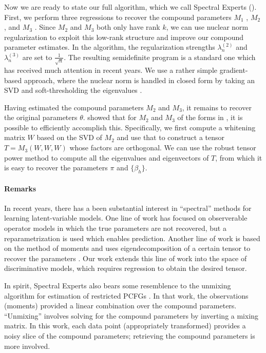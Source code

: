Now we are ready to state our full algorithm, which we call Spectral Experts
().
First, we perform three regressions to recover the compound parameters
$M_1$ ,
$M_2$ , and
$M_3$ .
Since $M_2$ and $M_3$ both only have rank $k$,
we can use nuclear norm regularization
\cite{Tomioka2011,NegahbanWainwright2009}
to exploit this low-rank structure and improve our compound parameter estimates.
In the algorithm, the regularization strengths $\lambda_n^{(2)}$ and $\lambda_n^{(3)}$
are set to $\frac{1}{\sqrt{n}}$.
The resulting semidefinite program is a standard one which has received
much attention in recent years.
We use a rather simple gradient-based approach,
where the nuclear norm is handled in closed form by taking an SVD
and soft-thresholding the eigenvalues \cite{donoho95soft,cai10soft}.

Having estimated the compound parameters $M_2$ and $M_3$,
it remains to recover the original parameters $\theta$.
\citet{AnandkumarGeHsu2012} showed that for $M_2$ and $M_3$ of
the forms in , it is possible to efficiently accomplish this.
Specifically, we first compute a whitening matrix $W$ based on the SVD of $M_2$
and use that to construct a tensor $T = M_3(W, W, W)$ whose factors are orthogonal.
We can use the robust tensor power method to compute all the
eigenvalues and eigenvectors of $T$, from which it is easy to recover
the parameters $\pi$ and $\{\beta_h\}$.

\paragraph{Remarks}

In recent years, there has a been substantial interest in ``spectral'' methods
for learning latent-variable models.  One line of work has
focused on observerable operator models \cite{hsu09spectral}
in which the true parameters are not recovered, but a reparametrization is used
which enables prediction.
Another line of work is based on the method of moments and uses eigendecomposition of a certain tensor
to recover the parameters \cite{anandkumar12moments,anandkumar12svd,AnandkumarHsuKakade2012}.
Our work extends this line of work into the space of discriminative models,
which requires regression to obtain the desired tensor.

In spirit, Spectral Experts also bears some resemblence to the unmixing
algorithm for estimation of restricted PCFGs
\cite{hsu12identifiability}.
In that work, the observations (moments) provided a linear combination over
the compound parameters.  ``Unmixing'' involves solving for the compound
parameters by inverting a mixing matrix.  In this work,
each data point (appropriately transformed) provides a noisy slice of the
compound parameters; retrieving the compound parameters is more involved.

